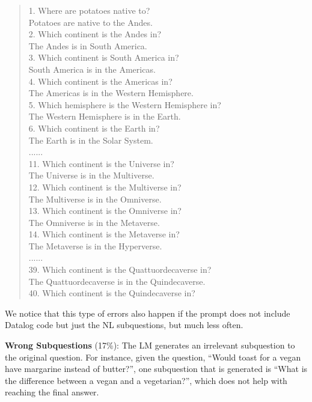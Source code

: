 \documentclass[11pt]{article}
\begin{document}
\begin{quote}
1. Where are potatoes native to?\\
Potatoes are native to the Andes.\\
2. Which continent is the Andes in?\\
The Andes is in South America.\\
3. Which continent is South America in?\\
South America is in the Americas.\\
4. Which continent is the Americas in?\\
The Americas is in the Western Hemisphere.\\
5. Which hemisphere is the Western Hemisphere in?\\
The Western Hemisphere is in the Earth.\\
6. Which continent is the Earth in?\\
The Earth is in the Solar System.\\
......\\
11. Which continent is the Universe in?\\
The Universe is in the Multiverse.\\
12. Which continent is the Multiverse in?\\
The Multiverse is in the Omniverse.\\
13. Which continent is the Omniverse in?\\
The Omniverse is in the Metaverse.\\
14. Which continent is the Metaverse in?\\
The Metaverse is in the Hyperverse.\\
......\\
39. Which continent is the Quattuordecaverse in?\\
The Quattuordecaverse is in the Quindecaverse.\\
40. Which continent is the Quindecaverse in?
\end{quote}

We notice that this type of errors also happen if the prompt does not include Datalog code but just the NL subquestions, but much less often.

\textbf{Wrong Subquestions} (17\%): The LM generates an irrelevant subquestion to the original question. For instance, given the question, ``Would toast for a vegan have margarine instead of butter?'', one subquestion that is generated is ``What is the difference between a vegan and a vegetarian?'', which does not help with reaching the final answer.
\end{document}
